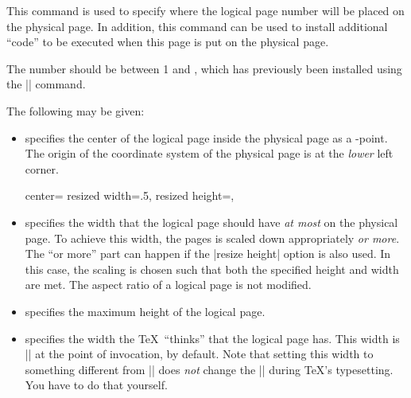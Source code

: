\begin{command}{\pgfpageslogicalpageoptions{}}
  This command is used to specify where the logical page number
   will be placed on the physical page. In
  addition, this command can be used to install additional ``code'' to
  be executed when this page is put on the physical page.

  The number  should be between 1 and
  , which has previously been installed using the
  |\pgfpagesphysicalpageoptions| command.

  The following  may be given:
  \begin{itemize}
  \item
    specifies the center of the logical page inside the physical page
    as a \pgfname-point. The origin of the coordinate system of the
    physical page is at the \emph{lower} left corner.

\begin{codeexample}
{%
  center=\pgfpoint{.25\pgfphysicalwidth}{.5\pgfphysicalheight}%
  resized width=.5\pgfphysicalwidth,%
  resized height=\pgfphysicalheight,%
}
\end{codeexample}

  \item
    specifies the width that the logical page should have \emph{at
    most} on the physical page. To achieve this width, the pages is
    scaled down appropriately \emph{or more}. The ``or more'' part
    can happen if the |resize height| option is also used. In this
    case, the scaling is chosen such that both the specified height
    and width are met. The aspect ratio of a logical page is not
    modified.
  \item
    specifies the maximum height of the logical page.
  \item
    specifies the width the \TeX\ ``thinks'' that the logical page
    has. This width is |\paperwidth| at the point of invocation, by
    default. Note that setting this width to something different from
    |\paperwidth| does \emph{not} change the |\pagewidth| during
    \TeX's typesetting. You have to do that yourself.


\end{itemize}
\end{command}
